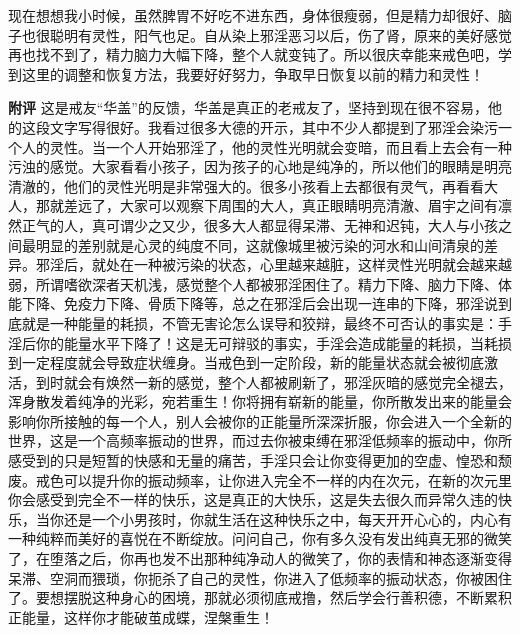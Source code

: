\begin{case}
    现在想想我小时候，虽然脾胃不好吃不进东西，身体很瘦弱，但是精力却很好、脑子也很聪明有灵性，阳气也足。自从染上邪淫恶习以后，伤了肾，原来的美好感觉再也找不到了，精力脑力大幅下降，整个人就变钝了。所以很庆幸能来戒色吧，学到这里的调整和恢复方法，我要好好努力，争取早日恢复以前的精力和灵性！

    \textbf{附评} 这是戒友“华盖”的反馈，华盖是真正的老戒友了，坚持到现在很不容易，他的这段文字写得很好。我看过很多大德的开示，其中不少人都提到了邪淫会染污一个人的灵性。当一个人开始邪淫了，他的灵性光明就会变暗，而且看上去会有一种污浊的感觉。大家看看小孩子，因为孩子的心地是纯净的，所以他们的眼睛是明亮清澈的，他们的灵性光明是非常强大的。很多小孩看上去都很有灵气，再看看大人，那就差远了，大家可以观察下周围的大人，真正眼睛明亮清澈、眉宇之间有凛然正气的人，真可谓少之又少，很多大人都显得呆滞、无神和迟钝，大人与小孩之间最明显的差别就是心灵的纯度不同，这就像城里被污染的河水和山间清泉的差异。邪淫后，就处在一种被污染的状态，心里越来越脏，这样灵性光明就会越来越弱，所谓嗜欲深者天机浅，感觉整个人都被邪淫困住了。精力下降、脑力下降、体能下降、免疫力下降、骨质下降等，总之在邪淫后会出现一连串的下降，邪淫说到底就是一种能量的耗损，不管无害论怎么误导和狡辩，最终不可否认的事实是：手淫后你的能量水平下降了！这是无可辩驳的事实，手淫会造成能量的耗损，当耗损到一定程度就会导致症状缠身。当戒色到一定阶段，新的能量状态就会被彻底激活，到时就会有焕然一新的感觉，整个人都被刷新了，邪淫灰暗的感觉完全褪去，浑身散发着纯净的光彩，宛若重生！你将拥有崭新的能量，你所散发出来的能量会影响你所接触的每一个人，别人会被你的正能量所深深折服，你会进入一个全新的世界，这是一个高频率振动的世界，而过去你被束缚在邪淫低频率的振动中，你所感受到的只是短暂的快感和无量的痛苦，手淫只会让你变得更加的空虚、惶恐和颓废。戒色可以提升你的振动频率，让你进入完全不一样的内在次元，在新的次元里你会感受到完全不一样的快乐，这是真正的大快乐，这是失去很久而异常久违的快乐，当你还是一个小男孩时，你就生活在这种快乐之中，每天开开心心的，内心有一种纯粹而美好的喜悦在不断绽放。问问自己，你有多久没有发出纯真无邪的微笑了，在堕落之后，你再也发不出那种纯净动人的微笑了，你的表情和神态逐渐变得呆滞、空洞而猥琐，你扼杀了自己的灵性，你进入了低频率的振动状态，你被困住了。要想摆脱这种身心的困境，那就必须彻底戒撸，然后学会行善积德，不断累积正能量，这样你才能破茧成蝶，涅槃重生！
\end{case}

